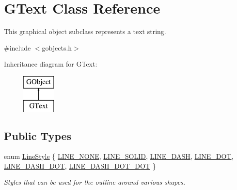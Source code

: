 \hypertarget{classsgl_1_1GText}{}\section{G\+Text Class Reference}
\label{classsgl_1_1GText}


This graphical object subclass represents a text string.  




{\ttfamily \#include $<$gobjects.\+h$>$}

Inheritance diagram for G\+Text\+:\begin{figure}[H]
\begin{center}
\leavevmode
\includegraphics[height=2.000000cm]{classsgl_1_1GText}
\end{center}
\end{figure}
\subsection*{Public Types}
\begin{DoxyCompactItemize}
\item 
enum \mbox{\hyperlink{classsgl_1_1GObject_a86e0f5648542856159bb40775c854aa7}{Line\+Style}} \{ \mbox{\hyperlink{classsgl_1_1GObject_a86e0f5648542856159bb40775c854aa7acbc84bd5232621834ed31f44d457c1eb}{L\+I\+N\+E\+\_\+\+N\+O\+NE}}, 
\mbox{\hyperlink{classsgl_1_1GObject_a86e0f5648542856159bb40775c854aa7a700c78bc2cd76acaab26651bf7b4941f}{L\+I\+N\+E\+\_\+\+S\+O\+L\+ID}}, 
\mbox{\hyperlink{classsgl_1_1GObject_a86e0f5648542856159bb40775c854aa7a9ccba0845f785d81d07b333ae1aad84e}{L\+I\+N\+E\+\_\+\+D\+A\+SH}}, 
\mbox{\hyperlink{classsgl_1_1GObject_a86e0f5648542856159bb40775c854aa7a8e811c096cb941997f0bfda168bb6df3}{L\+I\+N\+E\+\_\+\+D\+OT}}, 
\mbox{\hyperlink{classsgl_1_1GObject_a86e0f5648542856159bb40775c854aa7ada15a2e3d737b2db7706d8300f91b89d}{L\+I\+N\+E\+\_\+\+D\+A\+S\+H\+\_\+\+D\+OT}}, 
\mbox{\hyperlink{classsgl_1_1GObject_a86e0f5648542856159bb40775c854aa7aabf4053a73eafa7ba2b7e6d664c74c1d}{L\+I\+N\+E\+\_\+\+D\+A\+S\+H\+\_\+\+D\+O\+T\+\_\+\+D\+OT}}
 \}
\begin{DoxyCompactList}\small\item\em Styles that can be used for the outline around various shapes. \end{DoxyCompactList}\end{DoxyCompactItemize}
